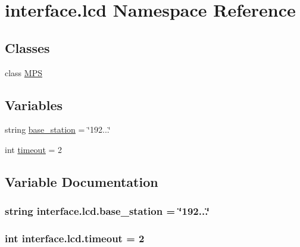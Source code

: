 \hypertarget{namespaceinterface_1_1lcd}{}\section{interface.\+lcd Namespace Reference}
\label{namespaceinterface_1_1lcd}
\subsection*{Classes}
\begin{DoxyCompactItemize}
\item 
class \hyperlink{classinterface_1_1lcd_1_1MPS}{M\+P\+S}
\end{DoxyCompactItemize}
\subsection*{Variables}
\begin{DoxyCompactItemize}
\item 
string \hyperlink{namespaceinterface_1_1lcd_afdf98a662faa5ccc4b9cf6c5d6c589e6}{base\+\_\+station} = \char`\"{}192...\char`\"{}
\item 
int \hyperlink{namespaceinterface_1_1lcd_a89a055478c9c324725aa47f80875e921}{timeout} = 2
\end{DoxyCompactItemize}


\subsection{Variable Documentation}
\hypertarget{namespaceinterface_1_1lcd_afdf98a662faa5ccc4b9cf6c5d6c589e6}{}
\subsubsection[{base\+\_\+station}]{\setlength{\rightskip}{0pt plus 5cm}string interface.\+lcd.\+base\+\_\+station = \char`\"{}192...\char`\"{}}\label{namespaceinterface_1_1lcd_afdf98a662faa5ccc4b9cf6c5d6c589e6}
\hypertarget{namespaceinterface_1_1lcd_a89a055478c9c324725aa47f80875e921}{}
\subsubsection[{timeout}]{\setlength{\rightskip}{0pt plus 5cm}int interface.\+lcd.\+timeout = 2}\label{namespaceinterface_1_1lcd_a89a055478c9c324725aa47f80875e921}
